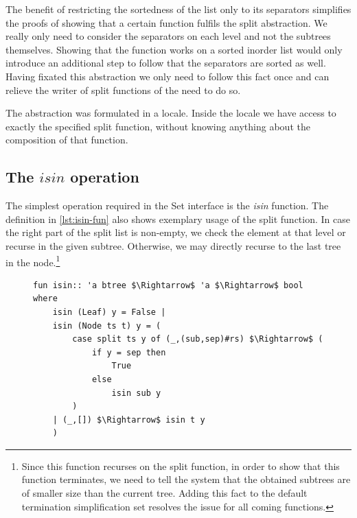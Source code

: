 The benefit of restricting the sortedness of the list only to its separators
simplifies the proofs of showing that a certain function fulfils the split abstraction.
We really only need to consider the separators on each level and not the subtrees themselves.
Showing that the function works on a sorted inorder list
would only introduce an additional step to follow that the separators are sorted as well.
Having fixated this abstraction we only need to follow this fact once
and can relieve the writer of split functions of the need to do so.

The abstraction was formulated in a locale.
Inside the locale we have access to exactly the specified split function,
without knowing anything about the composition of that function.

\subsection{The $isin$ operation}

The simplest operation required in the Set interface is
the \textit{isin} function.
The definition in \autoref{lst:isin-fun} also shows exemplary usage of the split function.
In case the right part of the split list is non-empty,
we check the element at that level or recurse in the given subtree.
Otherwise, we may directly recurse to the last tree in the node.\footnote{
    Since this function recurses on the split function,
    in order to show that this function terminates, we need to tell
    the system that the obtained subtrees are of smaller size than the current tree.
    Adding this fact to the default termination simplification set resolves
    the issue for all coming functions.
}

\begin{figure}
\begin{lstlisting}[mathescape=true, language=Isabelle, caption=The \textit{isin} function, label=lst:isin-fun]
fun isin:: 'a btree $\Rightarrow$ 'a $\Rightarrow$ bool where
    isin (Leaf) y = False |
    isin (Node ts t) y = (
        case split ts y of (_,(sub,sep)#rs) $\Rightarrow$ (
            if y = sep then
                True
            else
                isin sub y
        )
    | (_,[]) $\Rightarrow$ isin t y
    )
\end{lstlisting}
\end{figure}

